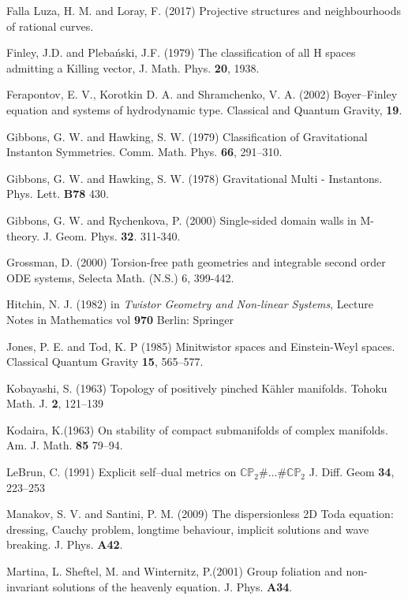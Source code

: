 \begin{thebibliography}{}
 Falla Luza, H. M. and Loray, F. (2017)  Projective structures and neighbourhoods of rational curves.

 Finley, J.D. and Pleba\'nski, J.F. (1979) The classification of all H spaces admitting a Killing
vector, J. Math. Phys. {\bf 20}, 1938.

  Ferapontov, E.  V., Korotkin D. A.  and Shramchenko, V. A. (2002)
Boyer–Finley equation and systems of hydrodynamic type.
Classical and Quantum Gravity, {\bf 19}.

 Gibbons, G. W. and Hawking, S. W. (1979) Classification of Gravitational Instanton Symmetries.
Comm. Math. Phys. {\bf 66}, 291--310.

Gibbons, G. W. and Hawking, S. W. (1978)
Gravitational Multi - Instantons.
Phys. Lett. \textbf{B78}
430.

Gibbons, G. W. and Rychenkova, P. (2000)
Single-sided domain walls in M-theory.
J. Geom. Phys. \textbf{32}. 311-340.

 Grossman, D. (2000) Torsion-free path geometries and integrable second order ODE systems, Selecta
Math. (N.S.) 6, 399-442.

 Hitchin, N. J. (1982) in {\em Twistor Geometry and Non-linear Systems}, Lecture Notes in Mathematics vol {\bf 970} Berlin: Springer

Jones, P. E. and  Tod, K. P (1985)
Minitwistor spaces and Einstein-Weyl spaces. 
Classical Quantum Gravity {\bf 15}, 565--577.

Kobayashi, S. (1963)
Topology of positively pinched K\"ahler manifolds.
Tohoku Math. J. {\bf 2}, 121--139

 Kodaira, K.(1963)
On stability of compact submanifolds of complex manifolds.
Am. J. Math. {\bf 85} 79--94.

 LeBrun, C. (1991)
Explicit self--dual metrics on $\mathbb{CP}_2\#\dots \#\mathbb{CP}_2$
J. Diff. Geom {\bf 34}, 223--253

 Manakov, S. V. and Santini, P. M. (2009)
The dispersionless 2D Toda equation: dressing, Cauchy problem, longtime behaviour, implicit solutions and wave breaking. J. Phys. {\bf A42}.

Martina, L. Sheftel, M. and Winternitz, P.(2001)
Group foliation and non-invariant
solutions of the heavenly equation.
J. Phys. {\bf A34}.


\end{thebibliography}
